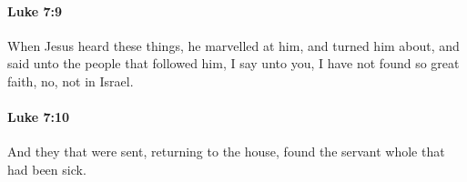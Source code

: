 		\paragraph{Luke 7:9} %
			\label{LUKE-7-9}

			When Jesus heard these things, he marvelled at him, and turned him about, and said unto the people that followed him, I say unto you, I have not found so great faith, no, not in Israel.

			\begin{framed}
			\scriptsize
				\begin{compactdesc}
					\item[SBLG] 
				\end{compactdesc}
			\end{framed}

		\paragraph{Luke 7:10} %
			\label{LUKE-7-10}

			And they that were sent, returning to the house, found the servant whole that had been sick.

